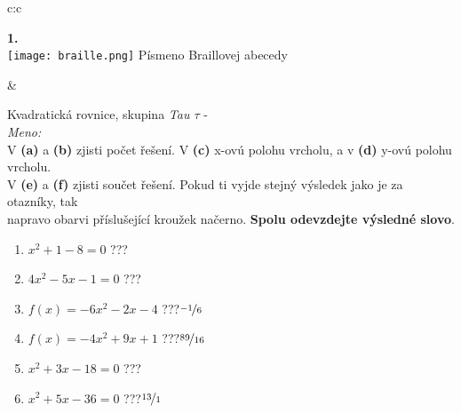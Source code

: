 \documentclass[10pt]{report}
\begin{document}
\begin{tabular}{c:c}
\begin{minipage}[c][99mm][t]{0.49\linewidth}
\begin{center}
\begin{minipage}{0.20\linewidth}
\begin{center}
{\Huge\bfseries 1.} \\[2mm]
\texttt{[image: braille.png]}
{\small Písmeno Braillovej abecedy}
\end{center}
\end{minipage}
\end{center}
\end{minipage}
&
\begin{minipage}[c][99mm][t]{0.49\linewidth}
\begin{center}
\vspace{7mm}
{\huge Kvadratická rovnice, skupina \textit{Tau $\tau$} -}\\[4.5mm]
\textit{Meno:}\phantom{xxxxxxxxxxxxxxxxxxxxxxxxxxxxxxxxxxxxxxxxxxxxxxxxxxxxxxxxxxxxxxxxx}\\[3.5mm]
V \textbf{(a)} a \textbf{(b)} zjisti počet řešení. V \textbf{(c)} x-ovú polohu vrcholu, a v \textbf{(d)} y-ovú polohu vrcholu.\\V \textbf{(e)} a \textbf{(f)} zjisti součet řešení. Pokud ti vyjde stejný výsledek jako je za otazníky, tak\\napravo obarvi příslušející kroužek načerno. \textbf{Spolu odevzdejte výsledné slovo}.\\[3mm]
\begin{minipage}{0.77\linewidth}
\begin{center}
\begin{varwidth}{\textwidth}
\begin{enumerate}
\large
\item $x^2+1-8=0$\quad \dotfill\; ???\;\dotfill {}
\item $4x^2-5x-1=0$\quad \dotfill\; ???\;\dotfill {}
\item $f(x)=-6x^2-2x-4$\quad \dotfill\; ???\;\dotfill \quad $\nicefrac{-1}{6}$
\item $f(x)=-4x^2+9x+1$\quad \dotfill\; ???\;\dotfill \quad $\nicefrac{89}{16}$
\item $x^2+3x-18=0$\quad \dotfill\; ???\;\dotfill {}
\item $x^2+5x-36=0$\quad \dotfill\; ???\;\dotfill \quad $\nicefrac{13}{1}$
\end{enumerate}
\end{varwidth}
\end{center}
\end{minipage}
\begin{minipage}{0.20\linewidth}
\begin{center}

\end{center}
\end{minipage}
\end{center}
\end{minipage}
\end{tabular}
\end{document}
